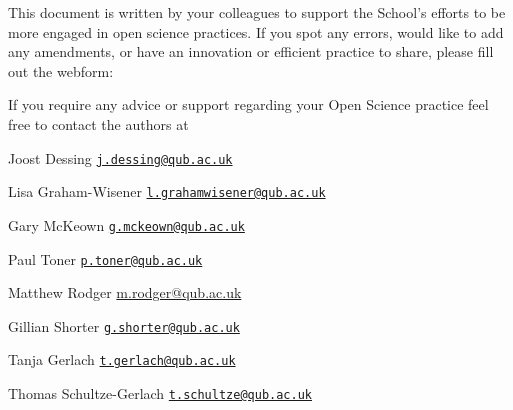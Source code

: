 \documentclass[
  letterpaper,
  DIV=11,
  numbers=noendperiod]{scrreprt}
\begin{document}
This document is written by your colleagues to support the School's
efforts to be more engaged in open science practices. If you spot any
errors, would like to add any amendments, or have an innovation or
efficient practice to share, please fill out the webform:~~

If you require any advice or support regarding your Open Science
practice feel free to contact the authors at~

Joost Dessing
\href{mailto:j.dessing@qub.ac.uk}{\nolinkurl{j.dessing@qub.ac.uk}}~

Lisa Graham-Wisener
\href{mailto:l.grahamwisener@qub.ac.uk}{\nolinkurl{l.grahamwisener@qub.ac.uk}}~~

Gary McKeown
\href{mailto:g.mckeown@qub.ac.uk}{\nolinkurl{g.mckeown@qub.ac.uk}}~~

Paul Toner
\href{mailto:p.toner@qub.ac.uk}{\nolinkurl{p.toner@qub.ac.uk}}~~

Matthew Rodger \href{mailto:m.rodgers@qub.ac.uk}{m.rodger@qub.ac.uk}~

Gillian Shorter
\href{mailto:g.shorter@qub.ac.uk}{\nolinkurl{g.shorter@qub.ac.uk}}~

Tanja Gerlach
\href{mailto:t.gerlach@qub.ac.uk}{\nolinkurl{t.gerlach@qub.ac.uk}}~

Thomas Schultze-Gerlach
\href{mailto:t.schultze@qub.ac.uk}{\nolinkurl{t.schultze@qub.ac.uk}}~
\end{document}

